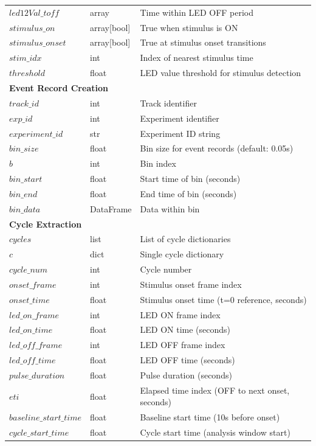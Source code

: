 \documentclass[
  11pt,
]{article}
\begin{document}
\begin{table}[H]
\begin{tabular}{p{3cm}p{2cm}p{9cm}}
$led12Val\_toff$ & array & Time within LED OFF period \\
$stimulus\_on$ & array[bool] & True when stimulus is ON \\
$stimulus\_onset$ & array[bool] & True at stimulus onset transitions \\
$stim\_idx$ & int & Index of nearest stimulus time \\
$threshold$ & float & LED value threshold for stimulus detection \\
\hline
\multicolumn{3}{l}{\textbf{Event Record Creation}} \\
\hline
$track\_id$ & int & Track identifier \\
$exp\_id$ & int & Experiment identifier \\
$experiment\_id$ & str & Experiment ID string \\
$bin\_size$ & float & Bin size for event records (default: 0.05s) \\
$b$ & int & Bin index \\
$bin\_start$ & float & Start time of bin (seconds) \\
$bin\_end$ & float & End time of bin (seconds) \\
$bin\_data$ & DataFrame & Data within bin \\
\hline
\multicolumn{3}{l}{\textbf{Cycle Extraction}} \\
\hline
$cycles$ & list & List of cycle dictionaries \\
$c$ & dict & Single cycle dictionary \\
$cycle\_num$ & int & Cycle number \\
$onset\_frame$ & int & Stimulus onset frame index \\
$onset\_time$ & float & Stimulus onset time (t=0 reference, seconds) \\
$led\_on\_frame$ & int & LED ON frame index \\
$led\_on\_time$ & float & LED ON time (seconds) \\
$led\_off\_frame$ & int & LED OFF frame index \\
$led\_off\_time$ & float & LED OFF time (seconds) \\
$pulse\_duration$ & float & Pulse duration (seconds) \\
$eti$ & float & Elapsed time index (OFF to next onset, seconds) \\
$baseline\_start\_time$ & float & Baseline start time (10s before onset) \\
$cycle\_start\_time$ & float & Cycle start time (analysis window start) \\

\end{tabular}
\end{table}
\end{document}
